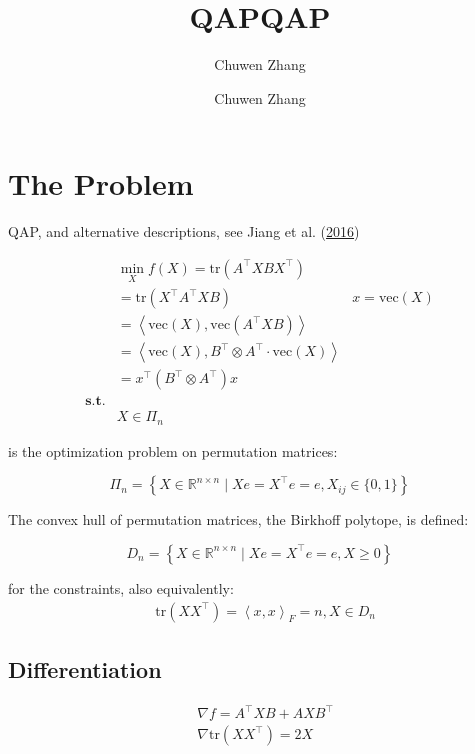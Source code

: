 \documentclass[
  10pt,
  a4paper,
,tablecaptionabove
]{scrartcl}
\title{QAP}
\author{Chuwen Zhang}
\date{}
\title{QAP}
\author{Chuwen Zhang}
\begin{document}




\hypertarget{the-problem}{%
\section{The Problem}\label{the-problem}}

QAP, and alternative descriptions, see Jiang et al.
(\protect\hyperlink{ref-jiang_l_p-norm_2016}{2016})

\[\begin{aligned}
&\min_X f(X) = \textrm{tr}(A^\top XB X^\top)  \\
& = \textrm{tr}(X^\top A^\top XB) & x = \textrm{vec}(X)\\
& = \left <\textrm{vec}(X),  \textrm{vec}(A^\top X B )  \right > \\
& = \left <\textrm{vec}(X), B^\top \otimes A^\top \cdot \textrm{vec}(X)  \right > \\ 
& = x^\top (B^\top \otimes A^\top) x\\ 
\mathbf{s.t.} & \\ 
&X \in \Pi_{n}
\end{aligned}\]

is the optimization problem on permutation matrices:

\[ \Pi_{n}=\left\{X \in \mathbb R ^{n \times n} \mid X e =X^{\top} e = e , X_{i j} \in\{0,1\}\right\}\]

The convex hull of permutation matrices, the Birkhoﬀ polytope, is
defined:

\[D _{n}=\left\{X \in \mathbb R ^{n \times n} \mid X e =X^{\top} e = e , X \geq 0 \right\}\]

for the constraints, also equivalently: \[\begin{aligned}
& \textrm{tr}(XX^\top) = \left <x, x \right >_F= n, X \in D_{n}
\end{aligned}\]

\hypertarget{differentiation}{%
\subsection{Differentiation}\label{differentiation}}

\[\begin{aligned}
&  \nabla f = A^\top XB + AXB^\top \\
& \nabla \textrm{tr}(XX^\top) = 2X
\end{aligned}\]
\end{document}
